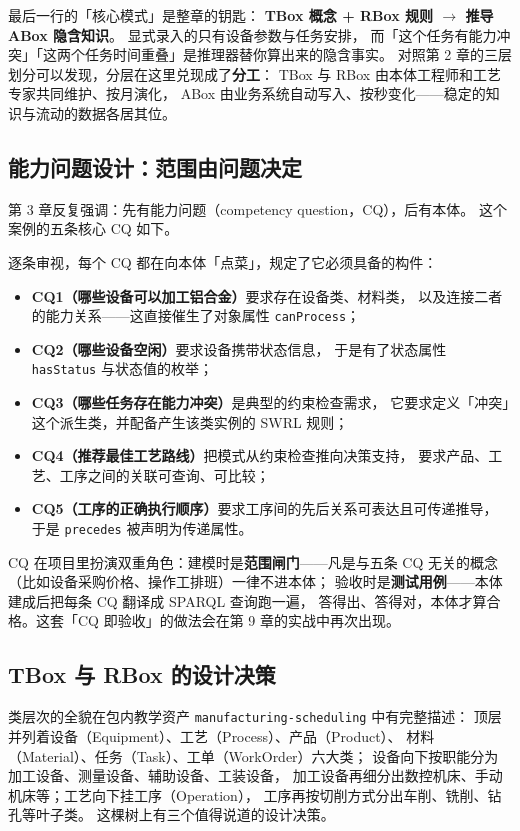 最后一行的「核心模式」是整章的钥匙：
\textbf{TBox 概念 + RBox 规则 \(\rightarrow\) 推导 ABox 隐含知识}。
显式录入的只有设备参数与任务安排，
而「这个任务有能力冲突」「这两个任务时间重叠」是推理器替你算出来的隐含事实。
对照第 2 章的三层划分可以发现，分层在这里兑现成了\textbf{分工}：
TBox 与 RBox 由本体工程师和工艺专家共同维护、按月演化，
ABox 由业务系统自动写入、按秒变化——稳定的知识与流动的数据各居其位。

\subsection{能力问题设计：范围由问题决定}

第 3 章反复强调：先有能力问题（competency question，CQ），后有本体。
这个案例的五条核心 CQ 如下。



逐条审视，每个 CQ 都在向本体「点菜」，规定了它必须具备的构件：
\begin{itemize}
\item \textbf{CQ1（哪些设备可以加工铝合金）}要求存在设备类、材料类，
  以及连接二者的能力关系——这直接催生了对象属性 \texttt{canProcess}；
\item \textbf{CQ2（哪些设备空闲）}要求设备携带状态信息，
  于是有了状态属性 \texttt{hasStatus} 与状态值的枚举；
\item \textbf{CQ3（哪些任务存在能力冲突）}是典型的约束检查需求，
  它要求定义「冲突」这个派生类，并配备产生该类实例的 SWRL 规则；
\item \textbf{CQ4（推荐最佳工艺路线）}把模式从约束检查推向决策支持，
  要求产品、工艺、工序之间的关联可查询、可比较；
\item \textbf{CQ5（工序的正确执行顺序）}要求工序间的先后关系可表达且可传递推导，
  于是 \texttt{precedes} 被声明为传递属性。
\end{itemize}

CQ 在项目里扮演双重角色：建模时是\textbf{范围闸门}——凡是与五条 CQ 无关的概念
（比如设备采购价格、操作工排班）一律不进本体；
验收时是\textbf{测试用例}——本体建成后把每条 CQ 翻译成 SPARQL 查询跑一遍，
答得出、答得对，本体才算合格。这套「CQ 即验收」的做法会在第 9 章的实战中再次出现。

\subsection{TBox 与 RBox 的设计决策}

类层次的全貌在包内教学资产 \texttt{manufacturing-scheduling} 中有完整描述：
顶层并列着设备（Equipment）、工艺（Process）、产品（Product）、
材料（Material）、任务（Task）、工单（WorkOrder）六大类；
设备向下按职能分为加工设备、测量设备、辅助设备、工装设备，
加工设备再细分出数控机床、手动机床等；工艺向下挂工序（Operation），
工序再按切削方式分出车削、铣削、钻孔等叶子类。
这棵树上有三个值得说道的设计决策。

